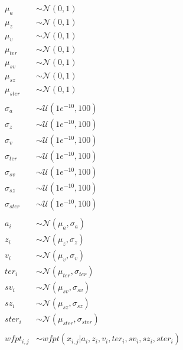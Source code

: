 \documentclass{article}
\begin{document}
\begin{align*}
\mu_{a} &\sim \mathcal{N}(0, 1) \\
\mu_{z} &\sim \mathcal{N}(0, 1) \\
\mu_{v} &\sim \mathcal{N}(0, 1) \\
\mu_{ter} &\sim \mathcal{N}(0, 1) \\
\mu_{sv} &\sim \mathcal{N}(0, 1) \\
\mu_{sz} &\sim \mathcal{N}(0, 1) \\
\mu_{ster} &\sim \mathcal{N}(0, 1) \\
\\
\sigma_{a} &\sim \mathcal{U}(1e^{-10}, 100) \\
\sigma_{z} &\sim \mathcal{U}(1e^{-10}, 100) \\
\sigma_{v} &\sim \mathcal{U}(1e^{-10}, 100) \\
\sigma_{ter} &\sim \mathcal{U}(1e^{-10}, 100) \\
\sigma_{sv} &\sim \mathcal{U}(1e^{-10}, 100) \\
\sigma_{sz} &\sim \mathcal{U}(1e^{-10}, 100) \\
\sigma_{ster} &\sim \mathcal{U}(1e^{-10}, 100) \\
\\
a_{i} &\sim \mathcal{N}(\mu_{a}, \sigma_{a}) \\
z_{i} &\sim \mathcal{N}(\mu_{z}, \sigma_{z}) \\
v_{i} &\sim \mathcal{N}(\mu_{v}, \sigma_{v}) \\
ter_{i} &\sim \mathcal{N}(\mu_{ter}, \sigma_{ter}) \\
sv_{i} &\sim \mathcal{N}(\mu_{sv}, \sigma_{sv}) \\
sz_{i} &\sim \mathcal{N}(\mu_{sz}, \sigma_{sz}) \\
ster_{i} &\sim \mathcal{N}(\mu_{ster}, \sigma_{ster}) \\
 \\
wfpt_{i, j} &\sim wfpt(x_{i, j} | a_{i}, z_{i}, v_{i}, ter_{i}, sv_{i}, sz_{i}, ster_{i})\\
\end{align*}
\end{document}
